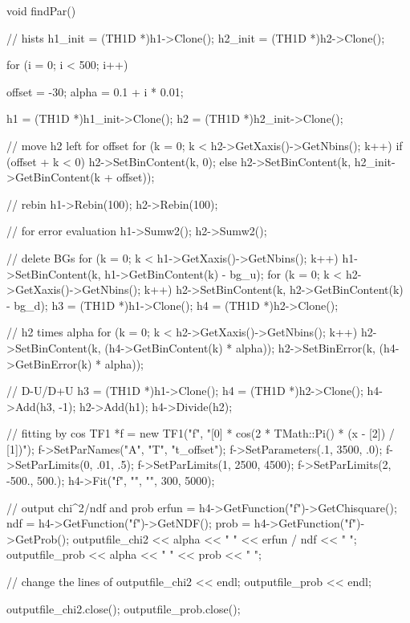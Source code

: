 \documentclass[dvipdfmx]{jsarticle}
\begin{document}
\begin{mylisting}[language=c++,caption=findPar.C]
void findPar()
{
    // hists
    h1_init = (TH1D *)h1->Clone();
    h2_init = (TH1D *)h2->Clone();

    for (i = 0; i < 500; i++)
    {
        offset = -30;
        alpha = 0.1 + i * 0.01;

        h1 = (TH1D *)h1_init->Clone();
        h2 = (TH1D *)h2_init->Clone();

        // move h2 left for offset
        for (k = 0; k < h2->GetXaxis()->GetNbins(); k++)
        {
            if (offset + k < 0)
            {
                h2->SetBinContent(k, 0);
            }
            else
            {
                h2->SetBinContent(k, h2_init->GetBinContent(k + offset));
            }
        }

        // rebin
        h1->Rebin(100);
        h2->Rebin(100);

        // for error evaluation
        h1->Sumw2();
        h2->Sumw2();

        // delete BGs
        for (k = 0; k < h1->GetXaxis()->GetNbins(); k++)
        {
            h1->SetBinContent(k, h1->GetBinContent(k) - bg_u);
        }
        for (k = 0; k < h2->GetXaxis()->GetNbins(); k++)
        {
            h2->SetBinContent(k, h2->GetBinContent(k) - bg_d);
        }
        h3 = (TH1D *)h1->Clone();
        h4 = (TH1D *)h2->Clone();

        // h2 times alpha
        for (k = 0; k < h2->GetXaxis()->GetNbins(); k++)
        {
            h2->SetBinContent(k,  (h4->GetBinContent(k) * alpha));
            h2->SetBinError(k, (h4->GetBinError(k) * alpha));
        }

        // D-U/D+U
        h3 = (TH1D *)h1->Clone();
        h4 = (TH1D *)h2->Clone();
        h4->Add(h3, -1);
        h2->Add(h1);
        h4->Divide(h2);

        // fitting by cos
        TF1 *f = new TF1("f", "[0] * cos(2 * TMath::Pi() * (x - [2]) / [1])");
        f->SetParNames("A", "T", "t_offset");
        f->SetParameters(.1, 3500, .0);
        f->SetParLimits(0, .01, .5);
        f->SetParLimits(1, 2500, 4500);
        f->SetParLimits(2, -500., 500.);
        h4->Fit("f", "", "", 300, 5000);

        // output chi^2/ndf and prob
        erfun = h4->GetFunction("f")->GetChisquare();
        ndf = h4->GetFunction("f")->GetNDF();
        prob = h4->GetFunction("f")->GetProb();
        outputfile_chi2 << alpha << " " << erfun / ndf << " ";
        outputfile_prob << alpha << " " << prob << " ";

        // change the lines of
        outputfile_chi2 << endl;
        outputfile_prob << endl;
    }
    outputfile_chi2.close();
    outputfile_prob.close();
}
\end{mylisting}
\end{document}
